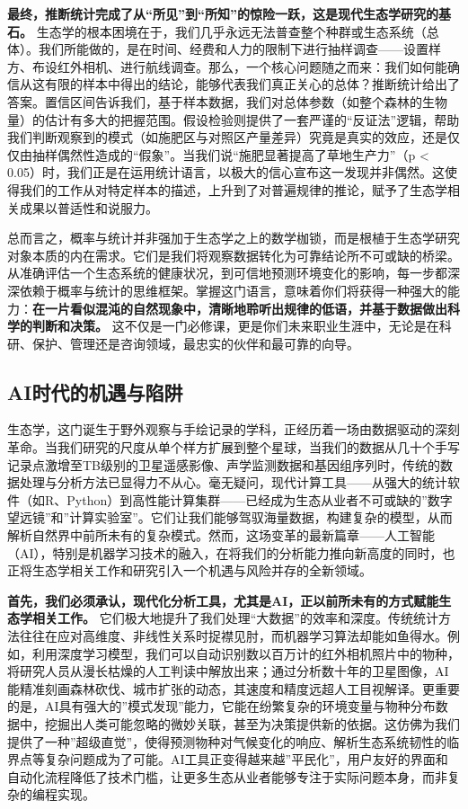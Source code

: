 \documentclass[
]{book}
\begin{document}
\textbf{最终，推断统计完成了从``所见''到``所知''的惊险一跃，这是现代生态学研究的基石。} 生态学的根本困境在于，我们几乎永远无法普查整个种群或生态系统（总体）。我们所能做的，是在时间、经费和人力的限制下进行抽样调查------设置样方、布设红外相机、进行航线调查。那么，一个核心问题随之而来：我们如何能确信从这有限的样本中得出的结论，能够代表我们真正关心的总体？推断统计给出了答案。置信区间告诉我们，基于样本数据，我们对总体参数（如整个森林的生物量）的估计有多大的把握范围。假设检验则提供了一套严谨的``反证法''逻辑，帮助我们判断观察到的模式（如施肥区与对照区产量差异）究竟是真实的效应，还是仅仅由抽样偶然性造成的``假象''。当我们说``施肥显著提高了草地生产力''（p \textless{} 0.05）时，我们正是在运用统计语言，以极大的信心宣布这一发现并非偶然。这使得我们的工作从对特定样本的描述，上升到了对普遍规律的推论，赋予了生态学相关成果以普适性和说服力。

总而言之，概率与统计并非强加于生态学之上的数学枷锁，而是根植于生态学研究对象本质的内在需求。它们是我们将观察数据转化为可靠结论所不可或缺的桥梁。从准确评估一个生态系统的健康状况，到可信地预测环境变化的影响，每一步都深深依赖于概率与统计的思维框架。掌握这门语言，意味着你们将获得一种强大的能力：\textbf{在一片看似混沌的自然现象中，清晰地聆听出规律的低语，并基于数据做出科学的判断和决策。} 这不仅是一门必修课，更是你们未来职业生涯中，无论是在科研、保护、管理还是咨询领域，最忠实的伙伴和最可靠的向导。

\hypertarget{aiux65f6ux4ee3ux7684ux673aux9047ux4e0eux9677ux9631}{%
\subsection{AI时代的机遇与陷阱}\label{aiux65f6ux4ee3ux7684ux673aux9047ux4e0eux9677ux9631}}

生态学，这门诞生于野外观察与手绘记录的学科，正经历着一场由数据驱动的深刻革命。当我们研究的尺度从单个样方扩展到整个星球，当我们的数据从几十个手写记录点激增至TB级别的卫星遥感影像、声学监测数据和基因组序列时，传统的数据处理与分析方法已显得力不从心。毫无疑问，现代计算工具------从强大的统计软件（如R、Python）到高性能计算集群------已经成为生态从业者不可或缺的''数字望远镜''和''计算实验室''。它们让我们能够驾驭海量数据，构建复杂的模型，从而解析自然界中前所未有的复杂模式。然而，这场变革的最新篇章------人工智能（AI），特别是机器学习技术的融入，在将我们的分析能力推向新高度的同时，也正将生态学相关工作和研究引入一个机遇与风险并存的全新领域。

\textbf{首先，我们必须承认，现代化分析工具，尤其是AI，正以前所未有的方式赋能生态学相关工作。} 它们极大地提升了我们处理``大数据''的效率和深度。传统统计方法往往在应对高维度、非线性关系时捉襟见肘，而机器学习算法却能如鱼得水。例如，利用深度学习模型，我们可以自动识别数以百万计的红外相机照片中的物种，将研究人员从漫长枯燥的人工判读中解放出来；通过分析数十年的卫星图像，AI能精准刻画森林砍伐、城市扩张的动态，其速度和精度远超人工目视解译。更重要的是，AI具有强大的''模式发现''能力，它能在纷繁复杂的环境变量与物种分布数据中，挖掘出人类可能忽略的微妙关联，甚至为决策提供新的依据。这仿佛为我们提供了一种''超级直觉''，使得预测物种对气候变化的响应、解析生态系统韧性的临界点等复杂问题成为了可能。AI工具正变得越来越''平民化''，用户友好的界面和自动化流程降低了技术门槛，让更多生态从业者能够专注于实际问题本身，而非复杂的编程实现。
\end{document}
